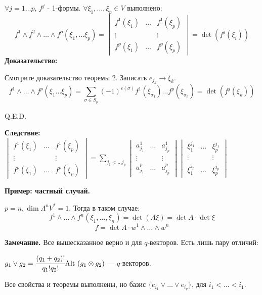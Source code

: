 $\forall j = 1\ldots p$, $f^j$ - 1-формы. $\forall \xi_1,\ldots,\xi_p \in V$ выполнено:
$$f^1\wedge f^2 \wedge \ldots \wedge f^p(\xi_1,\ldots \xi_p) = \begin{vmatrix}
    f^1(\xi_1) & \ldots & f^1(\xi_p)\\
    \vdots & &\vdots \\
    f^p(\xi_1) &\ldots & f^p(\xi_p)
\end{vmatrix} = \det (f^j(\xi_i))$$
\textbf{Доказательство:}

Смотрите доказательство теоремы 2. Записать $e_{j_k}\rightarrow \xi_k$.
$$f^1 \wedge \ldots \wedge f^p(\xi_1\ldots \xi_p) = \sum\limits_{\sigma \in S_p}(-1)^{\varepsilon(\sigma)} f^1(\xi_{\sigma_1})\ldots f^p(\xi_{\sigma_p}) = \det(f^{j}(\xi_k)) $$

\hfill Q.E.D.

\textbf{Следствие:} $\begin{vmatrix}
f^1(\xi_1) & \ldots & f^1(\xi_p)\\
\vdots & & \vdots \\
f^p(\xi_1) & \ldots & f^p(\xi_p)
\end{vmatrix} = \sum\limits_{j_1 < \ldots j_p} \begin{vmatrix}
    a_{j_1}^1 & \ldots & a^1_{j_p}\\
    \vdots & & \vdots \\
    a_{j_1}^p & \ldots & a_{j_{p}}^p
\end{vmatrix} \begin{vmatrix}
    \xi^{j_1}_{1} & \ldots & \xi_{p}^{j_1} \\
    \vdots & & \vdots \\
    \xi_{1}^{j_p} & \ldots & \xi_{p}^{j_p}
\end{vmatrix}$


\textbf{Пример: частный случай.}

$p=n, \dim \Lambda^n V^* =1 $. Тогда в таком случае:
$$f^1 \wedge \ldots \wedge f^n (\xi_1,\ldots , \xi_n) = \det(A\xi) = \det A \cdot \det \xi$$
$$f = \det A \cdot w^1\wedge \ldots \wedge w^n$$

\textbf{Замечание.} Все вышесказанное верно  и для $q$-векторов. Есть лишь пару отличий:

$g_1 \vee g_2 = \cfrac{(q_1+q_2)!}{q_1!q_2!} \text{Alt }(g_1 \otimes g_2)$ ---  $q$-векторов.

Все свойства и теоремы выполнены, но базис $\{e_{i_1}\vee \ldots \vee e_{i_q} \}$, для $i_1 < \ldots < i_1$.

